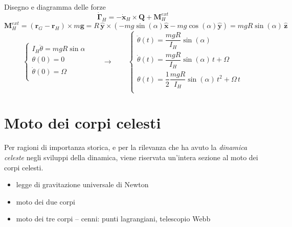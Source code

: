 \begin{example}
    {\color{red} Disegno e diagramma delle forze}
    \begin{equation}
        \dot{\mathbf{\Gamma}}_H = - \dot{\mathbf{x}}_H \times \mathbf{Q} + \mathbf{M}_H^{ext}
    \end{equation}
    \begin{equation}
        \mathbf{M}_H^{ext} = (\mathbf{r}_G - \mathbf{r}_H) \times m \mathbf{g} = R \, \mathbf{\hat{y}} \times (-m g \sin(\alpha) \mathbf{\hat{x}} - m g \cos(\alpha) \mathbf{\hat{y}}) = m g R \sin (\alpha) \, \mathbf{\hat{z}}
    \end{equation}
    \begin{equation}
        \begin{cases}
            I_H \ddot{\theta} = m g R \sin \alpha \\
            \theta(0) = 0 \\
            \dot{\theta}(0) = \Omega \\
        \end{cases}
        \qquad \rightarrow \qquad
        \begin{cases}
            \ddot{\theta}(t) = \dfrac{ m g R}{I_H} \sin (\alpha) \\
            \dot{ \theta}(t) = \dfrac{ m g R}{I_H} \sin (\alpha) \, t + \Omega \\
                  \theta (t) = \dfrac{1}{2} \dfrac{ m g R}{I_H} \sin(\alpha) \, t^2 + \Omega \, t \\
        \end{cases}
    \end{equation}
\end{example}

\begin{example}
\end{example}

\section{Moto dei corpi celesti}
Per ragioni di importanza storica, e per la rilevanza che ha avuto la \textit{dinamica celeste} negli sviluppi della dinamica, viene riservata un'intera sezione al moto dei corpi celesti.

{\color{red}
\begin{itemize}
    \item legge di gravitazione universale di Newton
    \item moto dei due corpi
    \item moto dei tre corpi -- cenni: punti lagrangiani, telescopio Webb 
\end{itemize}
}
